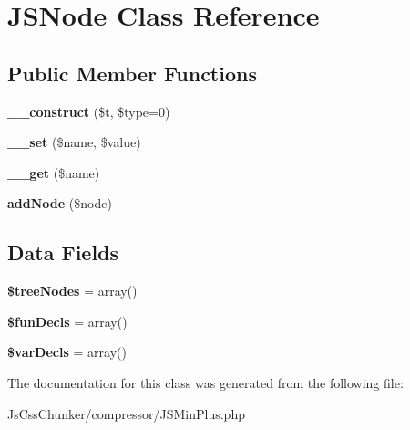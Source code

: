 \hypertarget{class_j_s_node}{
\section{JSNode Class Reference}
\label{class_j_s_node}
}
\subsection*{Public Member Functions}
\begin{DoxyCompactItemize}
\item 
\hypertarget{class_j_s_node_ac96af713e8243067ed56d9c99472a940}{
{\bfseries \_\-\_\-construct} (\$t, \$type=0)}
\label{class_j_s_node_ac96af713e8243067ed56d9c99472a940}

\item 
\hypertarget{class_j_s_node_a83c2703c91959192f759992ad5640b67}{
{\bfseries \_\-\_\-set} (\$name, \$value)}
\label{class_j_s_node_a83c2703c91959192f759992ad5640b67}

\item 
\hypertarget{class_j_s_node_abc8e9e31bb15c8a44c3210ec551407c8}{
{\bfseries \_\-\_\-get} (\$name)}
\label{class_j_s_node_abc8e9e31bb15c8a44c3210ec551407c8}

\item 
\hypertarget{class_j_s_node_a897744a861940668d7dcfe128e1c60fd}{
{\bfseries addNode} (\$node)}
\label{class_j_s_node_a897744a861940668d7dcfe128e1c60fd}

\end{DoxyCompactItemize}
\subsection*{Data Fields}
\begin{DoxyCompactItemize}
\item 
\hypertarget{class_j_s_node_abcc274e48b6ae522726fefb4e8d5ec71}{
{\bfseries \$treeNodes} = array()}
\label{class_j_s_node_abcc274e48b6ae522726fefb4e8d5ec71}

\item 
\hypertarget{class_j_s_node_a4917da36d7c00622b2efd8adc064ad43}{
{\bfseries \$funDecls} = array()}
\label{class_j_s_node_a4917da36d7c00622b2efd8adc064ad43}

\item 
\hypertarget{class_j_s_node_ae759d20ff42c337091a09b879da0f8cb}{
{\bfseries \$varDecls} = array()}
\label{class_j_s_node_ae759d20ff42c337091a09b879da0f8cb}

\end{DoxyCompactItemize}


The documentation for this class was generated from the following file:\begin{DoxyCompactItemize}
\item 
JsCssChunker/compressor/JSMinPlus.php\end{DoxyCompactItemize}

